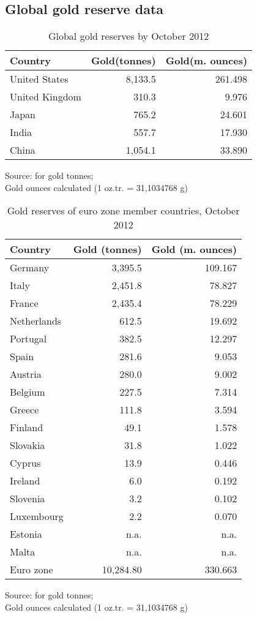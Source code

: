 \begin{appendix}


\chapter{Global gold reserve data}

\begin{table}[H]
\begin{tabular}{lrr}
Country        & Gold\newline(tonnes) & Gold\newline(m. ounces) \\
\hline
United States  & 8,133.5  & 261.498 \\
United Kingdom & 310.3    & 9.976 \\
Japan          & 765.2    & 24.601 \\
India          & 557.7    & 17.930 \\
China          & 1,054.1  & 33.890
\end{tabular}
\caption{Global gold reserves by October 2012}
Source:  for gold tonnes;\\
Gold ounces calculated (1 oz.tr. = 31,1034768 g)
\label{tab:gold_reserves_global}
\end{table}

\begin{table}[H]
\begin{tabular}{lrr}
Country & Gold (tonnes) & Gold (m. ounces)\\
\hline
Germany & 3,395.5 & 109.167\\
Italy & 2,451.8 & 78.827 \\
France & 2,435.4 & 78.229\\
Netherlands & 612.5 & 19.692\\
Portugal & 382.5 & 12.297\\
Spain & 281.6 & 9.053\\
Austria & 280.0 & 9.002\\
Belgium & 227.5 & 7.314\\
Greece & 111.8 & 3.594\\
Finland & 49.1 & 1.578\\
Slovakia & 31.8 & 1.022\\
Cyprus & 13.9 & 0.446\\
Ireland & 6.0 & 0.192\\
Slovenia & 3.2 & 0.102\\
Luxembourg & 2.2 & 0.070\\
Estonia & n.a. & n.a.\\
Malta & n.a. & n.a.\\
\hline
Euro zone & 10,284.80 & 330.663
\end{tabular}
\caption{Gold reserves of euro zone member countries, October 2012}
Source:  for gold tonnes;\\
Gold ounces calculated (1 oz.tr. = 31,1034768 g)
\label{tab:gold_reserves_euro_zone}
\end{table}


\end{appendix}

